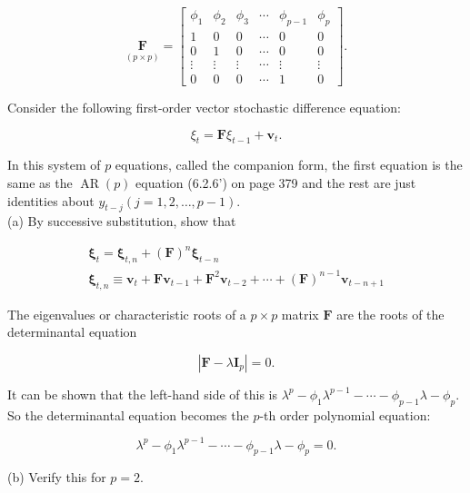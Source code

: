 \documentclass[10pt]{article}
\begin{document}
$$
\underset{(p \times p)}{\mathbf{F}}=\left[\begin{array}{cccccc}
\phi_{1} & \phi_{2} & \phi_{3} & \cdots & \phi_{p-1} & \phi_{p} \\
1 & 0 & 0 & \cdots & 0 & 0 \\
0 & 1 & 0 & \cdots & 0 & 0 \\
\vdots & \vdots & \vdots & \cdots & \vdots & \vdots \\
0 & 0 & 0 & \cdots & 1 & 0
\end{array}\right] .
$$

Consider the following first-order vector stochastic difference equation:


\begin{equation*}
\xi_{t}=\mathbf{F} \xi_{t-1}+\mathbf{v}_{t} . \tag{11}
\end{equation*}


In this system of $p$ equations, called the companion form, the first equation is the same as the $\operatorname{AR}(p)$ equation (6.2.6') on page 379 and the rest are just identities about $y_{t-j}(j=1,2, \ldots, p-1)$.\\
(a) By successive substitution, show that


\begin{gather*}
\boldsymbol{\xi}_{t}=\boldsymbol{\xi}_{t, n}+(\mathbf{F})^{n} \boldsymbol{\xi}_{t-n}  \tag{12}\\
\boldsymbol{\xi}_{t, n} \equiv \mathbf{v}_{t}+\mathbf{F} \mathbf{v}_{t-1}+\mathbf{F}^{2} \mathbf{v}_{t-2}+\cdots+(\mathbf{F})^{n-1} \mathbf{v}_{t-n+1}
\end{gather*}


The eigenvalues or characteristic roots of a $p \times p$ matrix $\mathbf{F}$ are the roots of the determinantal equation


\begin{equation*}
\left|\mathbf{F}-\lambda \mathbf{I}_{p}\right|=0 . \tag{13}
\end{equation*}


It can be shown that the left-hand side of this is $\lambda^{p}-\phi_{1} \lambda^{p-1}-\cdots-\phi_{p-1} \lambda-\phi_{p}$. So the determinantal equation becomes the $p$-th order polynomial equation:


\begin{equation*}
\lambda^{p}-\phi_{1} \lambda^{p-1}-\cdots-\phi_{p-1} \lambda-\phi_{p}=0 . \tag{14}
\end{equation*}


(b) Verify this for $p=2$.
\end{document}
